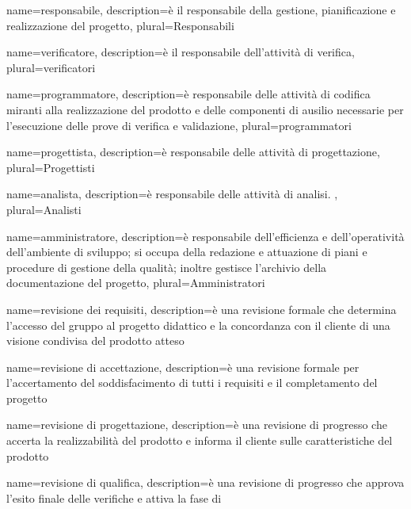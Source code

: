\makeglossary

 {
	name=responsabile,
	description={è il responsabile della gestione, pianificazione e realizzazione del progetto},
	plural=Responsabili
}

 {
	name=verificatore,
	description={è il responsabile dell'attività di verifica},
	plural=verificatori
}

 {
	name=programmatore,
	description={è responsabile delle attività di codifica miranti alla realizzazione del prodotto e delle componenti di ausilio necessarie per l'esecuzione delle prove di verifica e validazione},
	plural=programmatori
}

 {
	name=progettista,
	description={è responsabile delle attività di progettazione},
	plural=Progettisti
}

 {
	name=analista,
	description={è responsabile delle attività di analisi. },
	plural=Analisti
}

 {
	name=amministratore,
	description={è responsabile dell'efficienza e dell'operatività dell'ambiente di sviluppo; si occupa della redazione e attuazione di piani e procedure di gestione della qualità; inoltre gestisce l'archivio della documentazione del progetto},
	plural=Amministratori
}

 {
	name=revisione dei requisiti,
	description={è una revisione formale che determina l'accesso del gruppo al progetto didattico e la concordanza con il cliente di una visione condivisa del prodotto atteso}
}

 {
	name=revisione di accettazione,
	description={è una revisione formale per l'accertamento del soddisfacimento di tutti i requisiti e il completamento del progetto}
}

 {
	name=revisione di progettazione,
	description={è una revisione di progresso che accerta la realizzabilità del prodotto e informa il cliente sulle caratteristiche del prodotto}
}

 {
	name=revisione di qualifica,
	description={è una revisione di progresso che approva l'esito finale delle verifiche e attiva la fase di }
}

